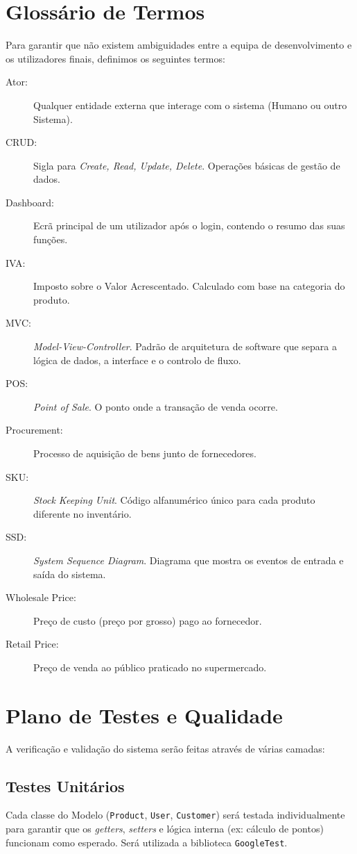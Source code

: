 \documentclass[runningheads,a4paper]{llncs}
\begin{document}
\newpage

\section{Glossário de Termos}

Para garantir que não existem ambiguidades entre a equipa de desenvolvimento e os utilizadores finais, definimos os seguintes termos:

\begin{description}
    \item[Ator:] Qualquer entidade externa que interage com o sistema (Humano ou outro Sistema).
    \item[CRUD:] Sigla para \textit{Create, Read, Update, Delete}. Operações básicas de gestão de dados.
    \item[Dashboard:] Ecrã principal de um utilizador após o login, contendo o resumo das suas funções.
    \item[IVA:] Imposto sobre o Valor Acrescentado. Calculado com base na categoria do produto.
    \item[MVC:] \textit{Model-View-Controller}. Padrão de arquitetura de software que separa a lógica de dados, a interface e o controlo de fluxo.
    \item[POS:] \textit{Point of Sale}. O ponto onde a transação de venda ocorre.
    \item[Procurement:] Processo de aquisição de bens junto de fornecedores.
    \item[SKU:] \textit{Stock Keeping Unit}. Código alfanumérico único para cada produto diferente no inventário.
    \item[SSD:] \textit{System Sequence Diagram}. Diagrama que mostra os eventos de entrada e saída do sistema.
    \item[Wholesale Price:] Preço de custo (preço por grosso) pago ao fornecedor.
    \item[Retail Price:] Preço de venda ao público praticado no supermercado.
\end{description}

\section{Plano de Testes e Qualidade}

A verificação e validação do sistema serão feitas através de várias camadas:

\subsection{Testes Unitários}
Cada classe do Modelo (\texttt{Product}, \texttt{User}, \texttt{Customer}) será testada individualmente para garantir que os \textit{getters}, \textit{setters} e lógica interna (ex: cálculo de pontos) funcionam como esperado. Será utilizada a biblioteca \texttt{GoogleTest}.
\end{document}
